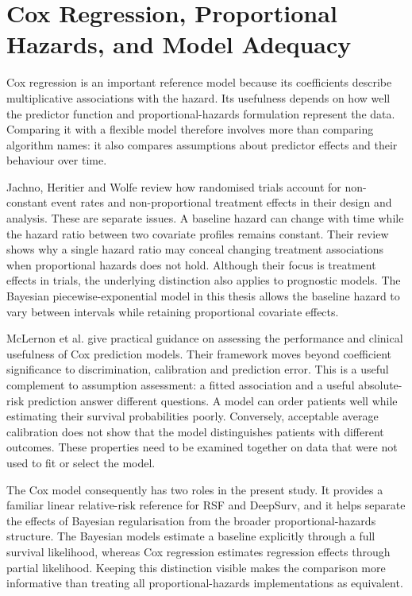 \section{Cox Regression, Proportional Hazards, and Model Adequacy}\label{cox-regression-proportional-hazards-and-model-adequacy}

Cox regression is an important reference model because its coefficients describe multiplicative associations with the hazard. Its usefulness depends on how well the predictor function and proportional-hazards formulation represent the data. Comparing it with a flexible model therefore involves more than comparing algorithm names: it also compares assumptions about predictor effects and their behaviour over time.

Jachno, Heritier and Wolfe \cite{ref17} review how randomised trials account for non-constant event rates and non-proportional treatment effects in their design and analysis. These are separate issues. A baseline hazard can change with time while the hazard ratio between two covariate profiles remains constant. Their review shows why a single hazard ratio may conceal changing treatment associations when proportional hazards does not hold. Although their focus is treatment effects in trials, the underlying distinction also applies to prognostic models. The Bayesian piecewise-exponential model in this thesis allows the baseline hazard to vary between intervals while retaining proportional covariate effects.

McLernon et al. \cite{ref84} give practical guidance on assessing the performance and clinical usefulness of Cox prediction models. Their framework moves beyond coefficient significance to discrimination, calibration and prediction error. This is a useful complement to assumption assessment: a fitted association and a useful absolute-risk prediction answer different questions. A model can order patients well while estimating their survival probabilities poorly. Conversely, acceptable average calibration does not show that the model distinguishes patients with different outcomes. These properties need to be examined together on data that were not used to fit or select the model.

The Cox model consequently has two roles in the present study. It provides a familiar linear relative-risk reference for RSF and DeepSurv, and it helps separate the effects of Bayesian regularisation from the broader proportional-hazards structure. The Bayesian models estimate a baseline explicitly through a full survival likelihood, whereas Cox regression estimates regression effects through partial likelihood. Keeping this distinction visible makes the comparison more informative than treating all proportional-hazards implementations as equivalent.

